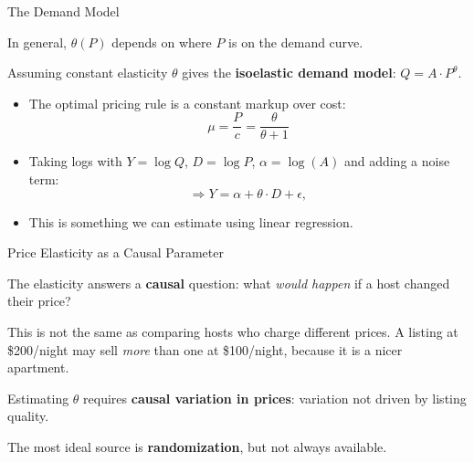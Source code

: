 \documentclass[aspectratio=169, 11pt]{beamer}
\begin{document}
\begin{frame}{The Demand Model}

In general, $\theta(P)$ depends on where $P$ is on the demand curve. 

\pause
\bigskip

Assuming constant elasticity $\theta$ gives the \textbf{isoelastic demand model}: $Q = A \cdot P^{\theta}$.

\begin{itemize}
    \item The optimal pricing rule is a constant markup over cost: 
    $$\mu = \frac{P}{c} = \frac{\theta}{\theta+1}$$
    \item Taking logs with $Y = \log Q$, $D = \log P$, $\alpha=\log(A)$ and adding a noise term:
    \[
    \Longrightarrow Y = \alpha + \theta \cdot D + \epsilon,
    \]
    \item This is something we can estimate using linear regression.
\end{itemize}

\end{frame}


\begin{frame}{Price Elasticity as a Causal Parameter}

The elasticity answers a \textbf{causal} question: what \emph{would happen} if a host changed their price?

\bigskip

This is not the same as comparing hosts who charge different prices. A listing at \$200/night may sell \emph{more} than one at \$100/night, because it is a nicer apartment.

\bigskip
\pause

Estimating $\theta$ requires \textbf{causal variation in prices}: variation not driven by listing quality. 

\bigskip

The most ideal source is \textbf{randomization}, but not always available.

\end{frame}
\end{document}
